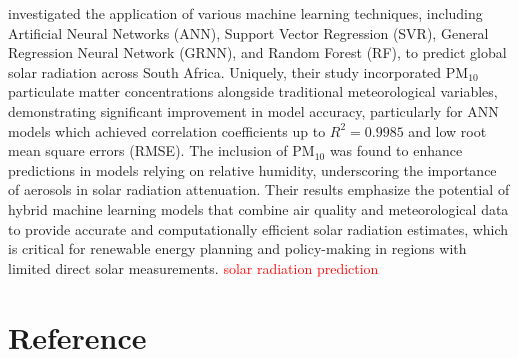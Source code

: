 \documentclass[11pt]{article}
\begin{document}
\citet{govindasamy2021machine} investigated the application of various machine learning techniques, including Artificial Neural Networks (ANN), Support Vector Regression (SVR), General Regression Neural Network (GRNN), and Random Forest (RF), to predict global solar radiation across South Africa. Uniquely, their study incorporated PM$_{10}$ particulate matter concentrations alongside traditional meteorological variables, demonstrating significant improvement in model accuracy, particularly for ANN models which achieved correlation coefficients up to \( R^{2} = 0.9985 \) and low root mean square errors (RMSE). The inclusion of PM$_{10}$ was found to enhance predictions in models relying on relative humidity, underscoring the importance of aerosols in solar radiation attenuation. Their results emphasize the potential of hybrid machine learning models that combine air quality and meteorological data to provide accurate and computationally efficient solar radiation estimates, which is critical for renewable energy planning and policy-making in regions with limited direct solar measurements. \textcolor{red}{solar radiation prediction}

\section{Reference}


\end{document}
